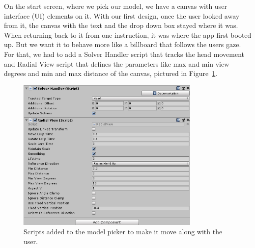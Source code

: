 \begin{description}[align=left]
	\item[Model Picker Billboard] 
	On the start screen, where we pick our model, we have a canvas with user interface (UI) elements on it. With our first design, once the user looked away from it, the canvas with the text and the drop down box stayed where it was. When returning back to it from one instruction, it was where the app first booted up. But we want it to behave more like a billboard that follows the users gaze. For that, we had to add a Solver Handler script that tracks the head movement and Radial View script that defines the parameters like max and min view degrees and min and max distance of the canvas, pictured in Figure~\ref{fig:tagalong}.
	
	\begin{figure}[!ht]
		\captionsetup{justification=centering}
		\centering
		\includegraphics[width=0.8\textwidth]{media/tagalong.png}
		\hfill
		\caption{Scripts added to the model picker to make it move along with the user.}
		\label{fig:tagalong}
	\end{figure} 


\end{description}
